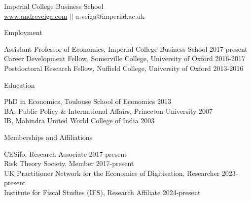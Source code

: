 \documentclass{resume}
\begin{document}
\begin{center}
\vspace{-2em}
Imperial College Business School  \\ 
\href{http://www.andreveiga.com}{www.andreveiga.com} 
\quad $||$ \quad 
a.veiga@imperial.ac.uk 
\vspace{0.5em}
\end{center}




\begin{rSection}{Employment}

Assistant Professor of Economics, Imperial College Business School \hfill {2017-present} 
\\ Career Development Fellow, Somerville College, University of Oxford \hfill {2016-2017} 
\\ Postdoctoral Research Fellow, Nuffield College, University of Oxford \hfill {2013-2016} 	
	
\end{rSection}











\begin{rSection}{Education}

PhD in Economics, Toulouse School of Economics \hfill {2013} 
\\ BA, Public Policy \& International Affairs, Princeton University \hfill {2007}
\\ IB, Mahindra United World College of India \hfill{2003}

\end{rSection}








\begin{rSection}{Memberships and Affiliations}

CESifo, Research Associate \hfill {2017-present} \\ 
Risk Theory Society, Member \hfill {2017-present} \\ 
UK Practitioner Network for the Economics of Digitisation, Researcher \hfill {2023-present} \\ 
Institute for Fiscal Studies (IFS), Research Affiliate \hfill {2024-present}
	
\end{rSection}
\end{document}
